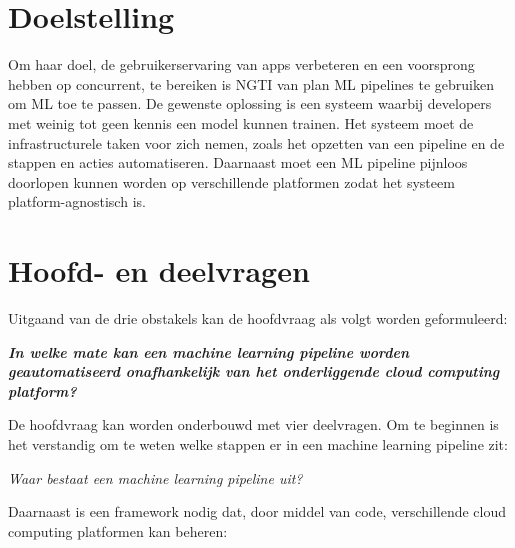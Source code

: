 
\section{Doelstelling}\label{sec:doelstelling}
Om haar doel, de gebruikerservaring van apps verbeteren en een voorsprong hebben op concurrent, te bereiken is NGTI van plan ML pipelines te gebruiken om ML toe te passen. De gewenste oplossing is een systeem waarbij developers met weinig tot geen kennis een model kunnen trainen. Het systeem moet de infrastructurele taken voor zich nemen, zoals het opzetten van een pipeline en de stappen en acties automatiseren. Daarnaast moet een ML pipeline pijnloos doorlopen kunnen worden op verschillende platformen zodat het systeem platform-agnostisch is.

\section{Hoofd- en deelvragen}\label{sec:hoofd-en-deelvragen}
Uitgaand van de drie obstakels kan de hoofdvraag als volgt worden geformuleerd:

\begin{quoting}
  \begin{center}
    \textbf{
      \textit{
        In welke mate kan een machine learning pipeline worden geautomatiseerd onafhankelijk van het onderliggende cloud computing platform?
      }
    }
  \end{center}
\end{quoting}\smallskip

De hoofdvraag kan worden onderbouwd met vier deelvragen. Om te beginnen is het verstandig om te weten welke stappen er in een machine learning pipeline zit:

\begin{quoting}
  \begin{center}
    \textit{
      Waar bestaat een machine learning pipeline uit?
    }
  \end{center}
\end{quoting}\smallskip

Daarnaast is een framework nodig dat, door middel van code, verschillende cloud computing platformen kan beheren:

